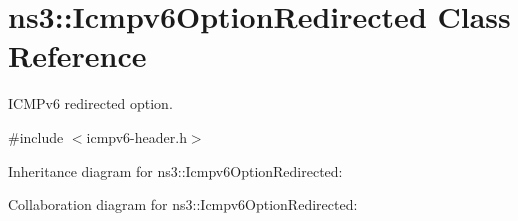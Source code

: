 \hypertarget{classns3_1_1Icmpv6OptionRedirected}{}\section{ns3\+:\+:Icmpv6\+Option\+Redirected Class Reference}
\label{classns3_1_1Icmpv6OptionRedirected}


I\+C\+M\+Pv6 redirected option.  




{\ttfamily \#include $<$icmpv6-\/header.\+h$>$}



Inheritance diagram for ns3\+:\+:Icmpv6\+Option\+Redirected\+:


Collaboration diagram for ns3\+:\+:Icmpv6\+Option\+Redirected\+:
